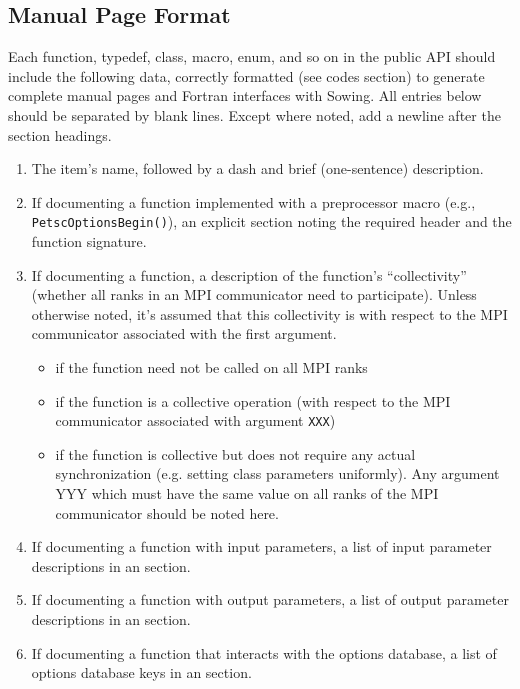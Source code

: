 \subsection{Manual Page Format}
\label{sec:manpageformat}
Each function, typedef, class, macro, enum, and so on in the public API should include the following data, correctly formatted
(see codes section) to generate complete manual pages and Fortran interfaces with Sowing.
All entries below should be separated by blank lines.
Except where noted, add a newline after the section headings.
\begin{enumerate}
  \item The item's name, followed by a dash and brief (one-sentence) description.
  \item If documenting a function implemented with a preprocessor macro (e.g., \lstinline{PetscOptionsBegin()}),
    an explicit  section noting the required header and the function signature.
  \item If documenting a function, a description of the function's ``collectivity''
    (whether all ranks in an MPI communicator need to participate). Unless otherwise noted,
    it's assumed that this collectivity is with respect to the MPI communicator associated with the first argument.
    \begin{itemize}
    \item {} if the function need not be called on all MPI ranks
    \item {} if the function is a collective operation
      (with respect to the MPI communicator associated with argument \lstinline{XXX})
    \item {} if
      the function is collective but does not require any actual synchronization
      (e.g. setting class parameters uniformly). Any argument YYY which must have the
        same value on all ranks of the MPI communicator should be noted here.
    \end{itemize}
  \item If documenting a function with input parameters, a list of input parameter descriptions in an  section.
  \item If documenting a function with output parameters, a list of output parameter descriptions in an  section.
  \item If documenting a function that interacts with the options database, a list of options database keys in an  section.

\end{enumerate}

